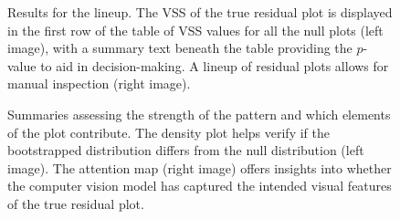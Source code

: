 \documentclass[
doublespace,
  times]{anzsauth}
\begin{document}
\begin{figure}


\caption{\label{fig-autovi-web-lineup}Results for the lineup. The VSS of
the true residual plot is displayed in the first row of the table of VSS
values for all the null plots (left image), with a summary text beneath
the table providing the \(p\)-value to aid in decision-making. A lineup
of residual plots allows for manual inspection (right image).}

\end{figure}%

\begin{figure}


\caption{\label{fig-autovi-web-distributions}Summaries assessing the
strength of the pattern and which elements of the plot contribute. The
density plot helps verify if the bootstrapped distribution differs from
the null distribution (left image). The attention map (right image)
offers insights into whether the computer vision model has captured the
intended visual features of the true residual plot.}

\end{figure}%
\end{document}
